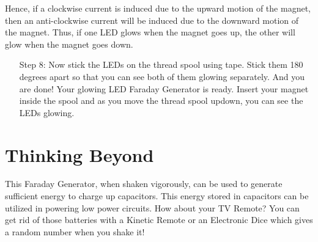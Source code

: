 Hence, if a clockwise current is induced due to the upward motion of
the magnet, then an anti-clockwise current will be induced due to the
downward motion of the magnet. Thus, if one LED glows when the
magnet goes up, the other will glow when the magnet goes down.
\begin{itemize}[resume]
    \item[Step 8:] Now stick the LEDs on the thread spool using tape. Stick them 180
        degrees apart so that you can see both of them glowing separately. And
        you are done! Your glowing LED Faraday Generator is ready. Insert
        your magnet inside the spool and as you move the thread spool updown, you can see the LEDs glowing.    
\end{itemize}

\section{Thinking Beyond}
This Faraday Generator, when shaken vigorously, can be used to generate
sufficient energy to charge up capacitors. This energy stored in capacitors
can be utilized in powering low power circuits. How about your TV Remote?
You can get rid of those batteries with a Kinetic Remote or an Electronic Dice
which gives a random number when you shake it!